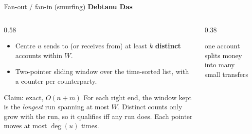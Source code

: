 \documentclass[aspectratio=169,11pt]{beamer}
\newcommand{\memberbadge}[1]{%
  \hfill{\small\bfseries\color{memberred}#1}%
}
\begin{document}
\begin{frame}{Fan-out / fan-in (smurfing) \memberbadge{Debtanu Das}}
\begin{columns}[T,onlytextwidth]
\begin{column}{0.58\textwidth}
\begin{itemize}
\setlength{\itemsep}{0.45em}
\item Centre $u$ sends to (or receives from) at least $k$ \textbf{distinct} accounts within $W$.
\item Two-pointer sliding window over the time-sorted list, with a counter per counterparty.
\end{itemize}

\vspace{0.3cm}
\begin{block}{Claim: exact, $O(n + m)$}
For each right end, the window kept is the \emph{longest} run spanning at most $W$. Distinct counts only grow with the run, so it qualifies iff any run does. Each pointer moves at most $\deg(u)$ times.
\end{block}
\end{column}
\begin{column}{0.38\textwidth}
\centering
\vspace{0.4cm}

\vspace{0.25cm}
{\footnotesize one account splits money into many small transfers}
\end{column}
\end{columns}
\end{frame}
\end{document}
